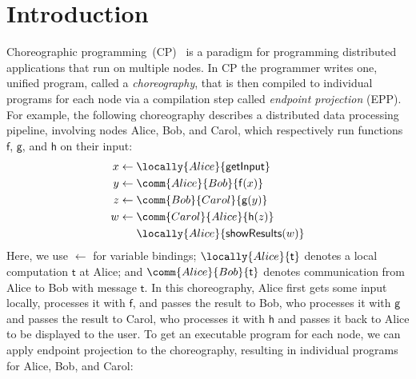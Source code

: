\section{Introduction}

Choreographic programming~(CP)~\citep{montesi-2013, montesi-2023} is a paradigm for programming distributed applications that run on multiple nodes.
%
In CP the programmer writes one, unified program, called a \emph{choreography}, that is then compiled to individual programs for each node via a compilation step called \emph{endpoint projection} (EPP).
%
For example, the following choreography describes a distributed data processing pipeline, involving nodes Alice, Bob, and Carol, which respectively run functions $\mathsf{f}$, $\mathsf{g}$, and $\mathsf{h}$ on their input:
%
\begin{equation*}
  \begin{split}
    x \leftarrow \; & \locally{Alice}{\mathsf{getInput}} \\
    y \leftarrow \; & \comm{Alice}{Bob}{\mathsf{f}(x)} \\
    z \leftarrow \; & \comm{Bob}{Carol}{\mathsf{g}(y)} \\
    w \leftarrow \; & \comm{Carol}{Alice}{\mathsf{h}(z)} \\
                    & \locally{Alice}{\mathsf{showResults}(w)} \\
  \end{split}
\end{equation*}
%
Here, we use $\leftarrow$ for variable bindings;
%
$\locally{Alice}{\mathsf{t}}$ denotes a local computation $\mathsf{t}$ at Alice;
%
and $\comm{Alice}{Bob}{\mathsf{t}}$ denotes communication from Alice to Bob with message $\mathsf{t}$.
%
In this choreography, Alice first gets some input locally, processes it with $\mathsf{f}$, and passes the result to Bob, who processes it with $\mathsf{g}$ and passes the result to Carol, who processes it with $\mathsf{h}$ and passes it back to Alice to be displayed to the user.
%
To get an executable program for each node, we can apply endpoint projection to the choreography, resulting in individual programs for Alice, Bob, and Carol:
%
\hspace{-1cm}

